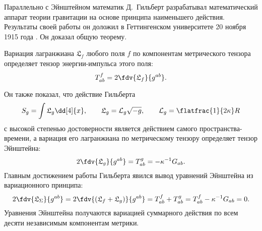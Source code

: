 \documentclass[\docroot/reports/draft/report.tex]{subfiles}
\begin{document}
    Параллельно с Эйнштейном математик Д.~Гильберт разрабатывал математический аппарат теории гравитации на основе принципа наименьшего действия. Результаты своей работы он доложил в Геттингенском университете 20 ноября 1915 года \cite{gilbert_phys}. Он доказал общую теорему.
    \begin{theorem*}
        Вариация лагранжиана $\mathfrak{L}_f$ любого поля $f$ по компонентам метрического тензора определяет тензор энергии-импульса этого поля:
        \begin{equation*}
            T^f_{ab} = 2 \fdv{\mathfrak{L}_f}{g^{ab}} .
        \end{equation*}
    \end{theorem*}
    Он также показал, что действие Гильберта
    \begin{equation}\label{eq:hilbert-lagr}
        S_g = \int \mathfrak{L}_g \dd[4]{x} , \qquad \mathfrak{L}_g = \mathcal{L}_g \sqrt{-g} , \qquad \mathcal{L}_g = \flatfrac{1}{2 \kappa} R
    \end{equation}
    с высокой степенью достоверности является действием самого пространства-времени, а вариация его лагранжиана по метрическому тензору определяет тензор Эйнштейна:
    \begin{equation*}
        2\fdv{\mathfrak{L}_g}{g^{ab}} = T^g_{ab} = - \kappa^{-1} G_{ab} .
    \end{equation*}
    Главным достижением работы Гильберта явился вывод уравнений Эйнштейна из вариационного принципа:
    \begin{equation*}
        2 \fdv{\mathfrak{L}_\Sigma}{g^{ab}} =
        2 \fdv{(\mathfrak{L}_f + \mathfrak{L}_g)}{g^{ab}} =
        T^f_{ab} + T^g_{ab} =
        T^f_{ab} - \kappa^{-1} G_{ab} =
        0 .
    \end{equation*}
    Уравнения Эйнштейна получаются вариацией суммарного действия по всем десяти независимым компонентам метрики.

\end{document}
